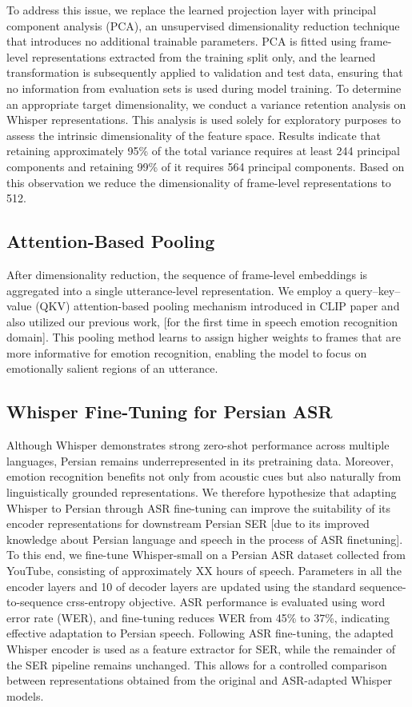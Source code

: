 \documentclass[conference]{IEEEtran}
\begin{document}
To address this issue, we replace the learned projection layer with principal component analysis (PCA), an unsupervised dimensionality reduction technique that introduces no additional trainable parameters. PCA is fitted using frame-level representations extracted from the training split only, and the learned transformation is subsequently applied to validation and test data, ensuring that no information from evaluation sets is used during model training.
To determine an appropriate target dimensionality, we conduct a variance retention analysis on Whisper representations. This analysis is used solely for exploratory purposes to assess the intrinsic dimensionality of the feature space. Results indicate that retaining approximately 95\% of the total variance requires at least 244 principal components and retaining 99\% of it requires 564 principal components. Based on this observation we reduce the dimensionality of frame-level representations to 512.
\subsection{Attention-Based Pooling}
After dimensionality reduction, the sequence of frame-level embeddings is aggregated into a single utterance-level representation. We employ a query–key–value (QKV) attention-based pooling mechanism introduced in CLIP paper and also utilized our previous work, [for the first time in speech emotion recognition domain]. This pooling method learns to assign higher weights to frames that are more informative for emotion recognition, enabling the model to focus on emotionally salient regions of an utterance.
\subsection{Whisper Fine-Tuning for Persian ASR}
Although Whisper demonstrates strong zero-shot performance across multiple languages, Persian remains underrepresented in its pretraining data. Moreover, emotion recognition benefits not only from acoustic cues but also naturally from linguistically grounded representations. We therefore hypothesize that adapting Whisper to Persian through ASR fine-tuning can improve the suitability of its encoder representations for downstream Persian SER [due to its improved knowledge about Persian language and speech in the process of ASR finetuning].
To this end, we fine-tune Whisper-small on a Persian ASR dataset collected from YouTube, consisting of approximately XX hours of speech. Parameters in all the encoder layers and 10 of decoder layers are updated using the standard sequence-to-sequence crss-entropy objective. ASR performance is evaluated using word error rate (WER), and fine-tuning reduces WER from 45\% to 37\%, indicating effective adaptation to Persian speech.
Following ASR fine-tuning, the adapted Whisper encoder is used as a feature extractor for SER, while the remainder of the SER pipeline remains unchanged. This allows for a controlled comparison between representations obtained from the original and ASR-adapted Whisper models.
\end{document}
